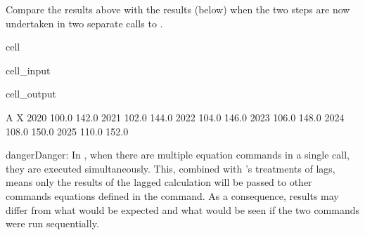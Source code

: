 \documentclass[letterpaper,10pt,english]{jupyterBook}
\begin{document}
\sphinxAtStartPar
{}

\sphinxAtStartPar
Compare the results above with the results (below) when the two steps are now undertaken in two separate calls to .

\begin{sphinxuseclass}{cell}\begin{sphinxVerbatimInput}

\begin{sphinxuseclass}{cell_input}
\begin{sphinxVerbatim}[commandchars=\\\{\}]
  

  
\end{sphinxVerbatim}

\end{sphinxuseclass}\end{sphinxVerbatimInput}
\begin{sphinxVerbatimOutput}

\begin{sphinxuseclass}{cell_output}
\begin{sphinxVerbatim}[commandchars=\\\{\}]
          A      X
2020  100.0  142.0
2021  102.0  144.0
2022  104.0  146.0
2023  106.0  148.0
2024  108.0  150.0
2025  110.0  152.0
\end{sphinxVerbatim}

\end{sphinxuseclass}\end{sphinxVerbatimOutput}

\end{sphinxuseclass}
\begin{sphinxadmonition}{danger}{Danger:}
\sphinxAtStartPar
In , when there are multiple equation commands in a single call, they are executed simultaneously. This, combined with ’s  treatments of lags, means only the results of the lagged calculation will be passed to other commands equations defined in the  command. As a consequence, results may differ from what would be expected and what would be seen if the two commands were run sequentially.
\end{sphinxadmonition}
\end{document}
